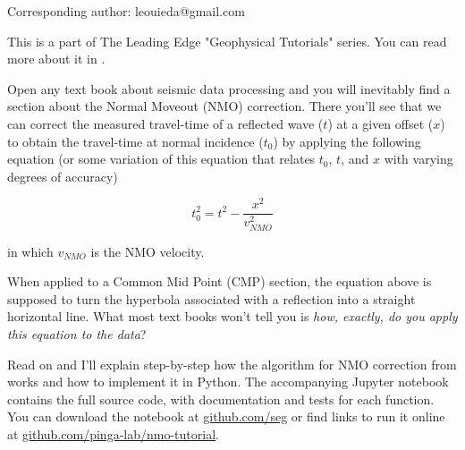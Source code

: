 Corresponding author: leouieda@gmail.com

This is a part of The Leading Edge "Geophysical Tutorials" series.
You can read more about it in \citet{Hall_2016a}.

Open any text book about seismic data processing and you will inevitably find a
section about the Normal Moveout (NMO) correction.
There you'll see that we can correct the measured travel-time of a reflected
wave ($t$) at a given offset ($x$) to obtain the travel-time at normal
incidence ($t_0$) by applying the following equation 
(or some variation of this equation that relates $t_0$, $t$, and $x$ with varying degrees of accuracy)

\begin{equation}
t_0^2=t^2-\dfrac{x^2}{v_{NMO}^2}
\label{eq:traveltime}
\end{equation}

in which $v_{NMO}$ is the NMO velocity.

When applied to a Common Mid Point (CMP) section, the equation above is
supposed to turn the hyperbola associated with a reflection into a straight
horizontal line.
What most text books won't tell you is \textit{how, exactly, do you apply this
equation to the data}?

Read on and I'll explain step-by-step how the algorithm for NMO correction from
\citet{Yilmaz_2001} works and how to implement it in Python.
The accompanying Jupyter notebook \citep{Perez_2007} contains the full source
code, with documentation and tests for each function.
You can download the notebook at
\href{https://github.com/seg}{github.com/seg} or
find links to run it online at
\href{https://github.com/pinga-lab/nmo-tutorial}{github.com/pinga-lab/nmo-tutorial}.

